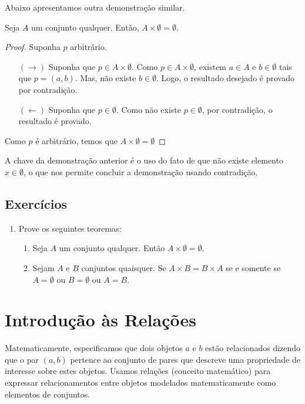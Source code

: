 Abaixo apresentamos outra demonstração similar.

\begin{Theorem}
Seja $A$ um conjunto qualquer. Então, $A \times \emptyset =
\emptyset$.
\end{Theorem}
\begin{proof}
Suponha $p$ arbitrário.
\begin{itemize}
    \item[$(\to)$] Suponha que $p \in A \times \emptyset$. Como $p \in
      A \times \emptyset$, existem $a \in A$ e $b\in \emptyset$ tais
      que $p = (a,b)$. Mas, não existe $b\in\emptyset$. Logo, o
      resultado desejado é provado por contradição.
    \item[$(\leftarrow)$] Suponha que $p \in \emptyset$. Como não
      existe $p\in\emptyset$, por contradição, o resultado é provado.
\end{itemize}
Como $p$ é arbitrário, temos que $A \times \emptyset = \emptyset$
\end{proof}

\begin{Commentary}
A chave da demonstração anterior é o uso do fato de que não existe
elemento $x \in \emptyset$, o que nos permite concluir a demonstração
usando contradição.
\end{Commentary}
\subsection{Exercícios}

\begin{enumerate}
  \item Prove os seguintes teoremas:
  \begin{enumerate}
    \item Seja $A$ um conjunto qualquer. Então $A \times \emptyset =
      \emptyset$.
    \item Sejam $A$ e $B$ conjuntos quaisquer. Se $A \times B =
      B\times A$ se e somente se $A = \emptyset$ ou $B = \emptyset$ ou
      $A = B$.
  \end{enumerate}
\end{enumerate}

\section{Introdução às Relações}

Matematicamente, especificamos que dois objetos $a$ e $b$ estão
relacionados dizendo que o par $(a,b)$ pertence ao conjunto de pares
que descreve uma propriedade de interesse sobre estes objetos. Usamos
relações (conceito matemático) para expressar relacionamentos entre
objetos modelados matematicamente como elementos de conjuntos.

